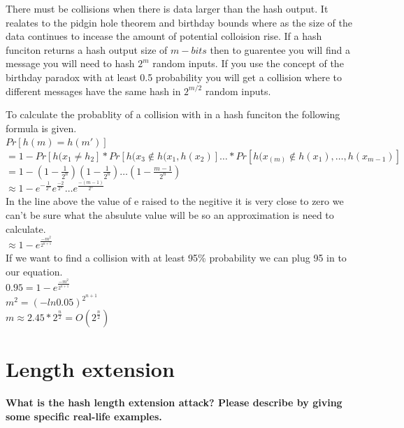 \documentclass[letterpaper,11pt,notitlepage,fleqn]{article}
\begin{document}
There must be collisions when there is data larger than the hash output. It realates to the pidgin hole theorem and birthday bounds where as the size of the data continues to incease the amount of potential colloision rise. If a hash funciton returns a hash output size of $m-bits$ then to guarentee you will find a message you will need to hash $2^{m}$ random inputs. If you use the concept of the birthday paradox with at least 0.5 probability you will get a collision where to different
messages have the same hash in $2^{m/2}$ random inputs. 

To calculate the probablity of a collision with in a hash funciton the following formula is given.\\
\indent $Pr[h(m) = h(m')]$ \\
\indent $= 1-Pr[h(x_{1} \neq h_{2}] \ast Pr[h(x_{3} \not\in {h(x_{1},h(x_{2})}] \dots \ast Pr[h(x_(m) \not\in {h(x_{1}), \dots ,h(x_{m-1})}]$ \\
\indent $= 1-(1-\frac{1}{2^{n}})(1-\frac{1}{2^{n}}) \dots (1-\frac{m-1}{2^{n}})$ \\
\indent $\approx 1-e^{-\frac{1}{2^{n}}}e^{\frac{-2}{2^{n}}} \dots e^{\frac{-(m-1)}{2^{n}}}$ \\
In the line above the value of e raised to the negitive it is very close to zero we can't be sure what the absulute value will be so an approximation is need to calculate. \\
\indent $\approx 1-e^{\frac{-m^{2}}{2^{n+1}}}$\\
If we want to find a collision with at least 95\% probability we can plug 95 in to our equation. \\
\indent $0.95 = 1-e^{\frac{-m^{2}}{2^{n+1}}}$\\
\indent $m^{2} = (-ln 0.05)^{2^{n+1}}$ \\
\indent $m \approx 2.45 \ast 2^{\frac{n}{2}} = O(2^{\frac{n}{2}})$ \\

\section{Length extension}
\noindent \textbf{What  is  the  hash  length  extension  attack?  Please  describe  by  giving  some  specific  real-life examples.}
\end{document}
